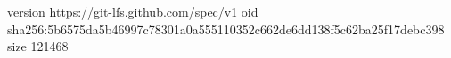 version https://git-lfs.github.com/spec/v1
oid sha256:5b6575da5b46997c78301a0a555110352c662de6dd138f5c62ba25f17debc398
size 121468
